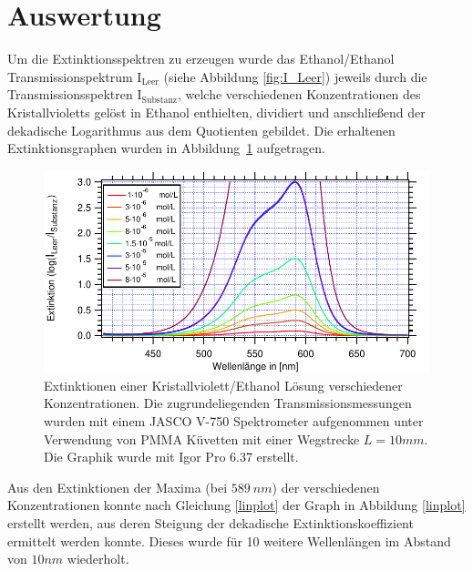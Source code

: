 \section{Auswertung}

Um die Extinktionsspektren zu erzeugen wurde das Ethanol/Ethanol Transmissionspektrum $\text{I}_{\text{Leer}}$ (siehe Abbildung \ref{fig:I_Leer}) jeweils durch die Transmissionsspektren $\text{I}_{\text{Substanz}}$, welche verschiedenen Konzentrationen des Kristallvioletts gelöst in Ethanol enthielten, dividiert und anschließend der dekadische Logarithmus aus dem Quotienten gebildet. Die erhaltenen Extinktionsgraphen wurden in Abbildung~\ref{fig:Extinktionalle} aufgetragen.


\begin{figure}[H]
	\centering	
	\begin{minipage}{1\textwidth}
	\includegraphics[width=\columnwidth]{Rohdaten/alleExtinktionenzusammen.pdf}	
	\caption{Extinktionen einer Kristallviolett/Ethanol Lösung verschiedener Konzentrationen. Die zugrundeliegenden Transmissionsmessungen wurden mit einem JASCO V-750 Spektrometer aufgenommen unter Verwendung von PMMA Küvetten mit einer Wegstrecke $L=10 \si{mm}$. Die Graphik wurde mit Igor Pro 6.37 erstellt.}
	\label{fig:Extinktionalle}
	\end{minipage}
	
\end{figure}
	


Aus den Extinktionen der Maxima (bei $589~\si{nm}$) der verschiedenen Konzentrationen konnte nach Gleichung \ref{linplot} der Graph in Abbildung \ref{linplot} erstellt werden, aus deren Steigung der dekadische Extinktionskoeffizient ermittelt werden konnte. Dieses wurde für 10 weitere Wellenlängen im Abstand von $10 \si{nm}$ wiederholt.